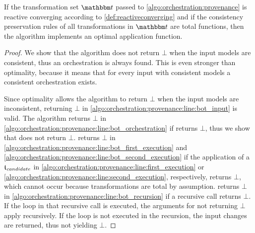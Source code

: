 \begin{theorem}
    If the transformation set $\transformationset{T}$ passed to \autoref{algo:orchestration:provenance} is reactive converging according to \autoref{def:reactiveconverging} and if the consistency preservation rules of all transformations in $\transformationset{T}$ are total functions, then the algorithm implements an optimal application function.
\end{theorem}
\begin{proof}
    We show that the algorithm does not return $\bot$ when the input models are consistent, thus an orchestration is always found.
    This is even stronger than optimality, because it means that for every input with consistent models a consistent orchestration exists.

    Since optimality allows the algorithm to return $\bot$ when the input models are inconsistent, returning $\bot$ in \autoref{algo:orchestration:provenance:line:bot_input} is valid.
    The algorithm returns $\bot$ in \autoref{algo:orchestration:provenance:line:bot_orchestration} if  returns $\bot$, thus we show that  does not return $\bot$.
     returns $\bot$ in \autoref{algo:orchestration:provenance:line:bot_first_execution} and \autoref{algo:orchestration:provenance:line:bot_second_execution} if the application of a $\provalgcandidate$ in \autoref{algo:orchestration:provenance:line:first_execution} or \autoref{algo:orchestration:provenance:line:second_execution}, respectively, returns $\bot$, which cannot occur because transformations are total by assumption.
     returns $\bot$ in \autoref{algo:orchestration:provenance:line:bot_recursion} if a recursive call returns $\bot$. If the loop in that recursive call is executed, the arguments for not returning $\bot$ apply recursively. If the loop is not executed in the recursion, the input changes are returned, thus not yielding $\bot$.
    

\end{proof}
